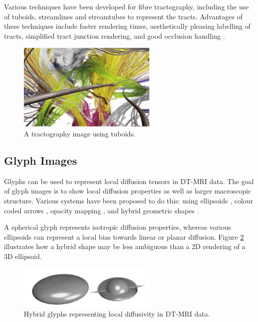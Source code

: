 \documentclass[MSc,paper=a4,pagesize=auto]{icldt}
\begin{document}
Various techniques have been developed for fibre tractography, including the use of tuboids, streamlines and streamtubes to represent the tracts. Advantages of these techniques include faster rendering times, aesthetically pleasing labelling of tracts, simplified tract junction rendering, and good occlusion handling \cite{Petrovic2007}.

\begin{figure}[htbp!]
    \centering
    \includegraphics[width=0.6\textwidth]{resources/tuboids}
    \caption{A tractography image using tuboids. \cite{Petrovic2007}}
    \label{fig:tuboids}
\end{figure}

\clearpage
\subsection{Glyph Images}
Glyphs can be used to represent local diffusion tensors in DT-MRI data. The goal of glyph images is to show local diffusion properties as well as larger macroscopic structure. Various systems have been proposed to do this: using ellipsoids \cite{Pierpaoli1996}, colour coded arrows \cite{Peled1998}, opacity mapping \cite{Westin1997}, and hybrid geometric shapes \cite{Westin2002}. 

A spherical glyph represents isotropic diffusion properties, whereas various ellipsoids can represent a local bias towards linear or planar diffusion. Figure \ref{fig:hybrid_glyphs} illustrates how a hybrid shape may be less ambiguous than a 2D rendering of a 3D ellipsoid.

\begin{figure}[htbp!]
    \centering
    \includegraphics[width=0.6\textwidth]{resources/hybrid_glyphs}
    \caption{Hybrid glyphs representing local diffusivity in DT-MRI data. \cite{Westin2002}}
    \label{fig:hybrid_glyphs}
\end{figure}
\end{document}
